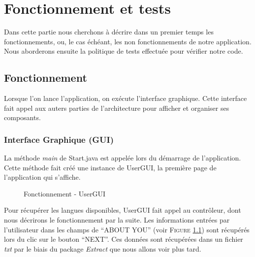 \chapter{Fonctionnement et tests}

Dans cette partie nous cherchons à décrire dans un premier temps les fonctionnements, ou, le cas échéant, les non fonctionnements de notre application.  Nous aborderons ensuite la politique de tests effectuée pour vérifier notre code. 

\section{Fonctionnement}

Lorsque l'on lance l'application, on exécute l'interface graphique. Cette interface fait appel aux auters parties de l'architecture pour afficher et organiser ses composants.

\subsection{Interface Graphique (GUI)}

La méthode \textit{main} de Start.java est appelée lors du démarrage de l'application. Cette méthode fait créé une instance de UserGUI, la première page de l'application qui s'affiche.

\begin{figure}[!ht]
\begin{center}
  \caption{Fonctionnement - UserGUI}
  \label{UserGUI} 
\end{center}
\end{figure}

Pour récupérer les langues disponibles, UserGUI fait appel au contrôleur, dont nous décrirons le fonctionnement par la suite.
Les informations entrées par l'utilisateur dans les champs de ``ABOUT YOU'' (voir \textsc{Figure} \ref{UserGUI}) sont récupérés lors du clic sur le bouton ``NEXT''. Ces données sont récupérées dans un fichier \textit{txt} par le biais du package \textit{Extract} que nous allons voir plus tard.

